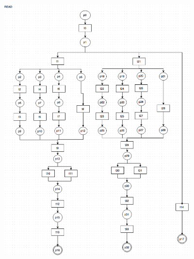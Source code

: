 \documentclass[conference]{IEEEtran}
\begin{document}
\begin{figure} 
\centerline{
\includegraphics[width=4in]{figures/Fih6.png}}


\end{figure}
\end{document}
